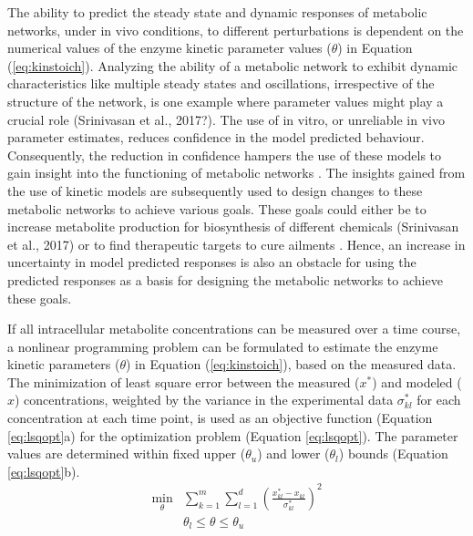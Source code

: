\documentclass[10pt]{article}
\begin{document}
The ability to predict the steady state and dynamic responses of metabolic networks, under in vivo conditions, to different perturbations is dependent on the numerical values of the enzyme kinetic parameter values ($\theta$) in Equation (\ref{eq:kinstoich}). Analyzing the ability of a metabolic network to exhibit dynamic characteristics like multiple steady states and oscillations, irrespective of the structure of the network, is one example where parameter values might play a crucial role \parencite{Srinivasan2015, Vital-Lopez2006}(Srinivasan et al., 2017?). The use of in vitro, or unreliable in vivo parameter estimates, reduces confidence in the model predicted behaviour. Consequently, the reduction in confidence hampers the use of these models to gain insight into the functioning of metabolic networks \parencite{Tran2008, Chakrabarti2013a}. The insights gained from the use of kinetic models are subsequently used to design changes to these metabolic networks to achieve various goals. These goals could either be to increase metabolite production for biosynthesis of different chemicals \parencite{Almquist2014, Khodayari2016, Costa2016, Andreozzi2016}(Srinivasan et al., 2017) or to find therapeutic targets to cure ailments \parencite{Apaolaza2017}. Hence, an increase in uncertainty in model predicted responses is also an obstacle for using the predicted responses as a basis for designing the metabolic networks to achieve these goals.  

If all intracellular metabolite concentrations can be measured over a time course, a nonlinear programming problem can be formulated to estimate the enzyme kinetic parameters ($\theta$) in Equation (\ref{eq:kinstoich}), based on the measured data. The minimization of least square error between the measured ($x^*$) and modeled ($x$) concentrations, weighted by the variance in the experimental data $\sigma_{kl}^*$ for each concentration at each time point, is used as an objective function (Equation \ref{eq:lsqopt}a) for the optimization problem (Equation \ref{eq:lsqopt}). The parameter values are determined within fixed upper ($\theta_u$) and lower ($\theta_l$) bounds (Equation \ref{eq:lsqopt}b). 
\begin{subequations}\label{eq:lsqopt}
	\begin{align}
	\underset{\theta}{\mathrm{min}} &\sum_{k=1}^{m}\sum_{l=1}^{d}\left(\frac{x_{kl}^*-x_{kl}}{\sigma_{kl}^*}\right)^2\\
	&\theta_l \le \theta \le \theta_u
	\end{align}
\end{subequations}
\end{document}
